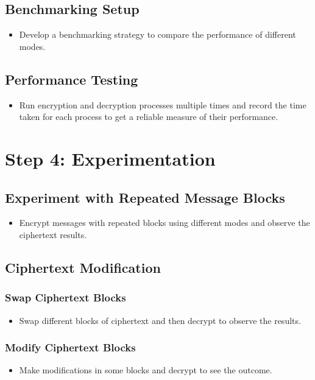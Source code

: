 \documentclass{exam}
\begin{document}
  \subsection*{Benchmarking Setup}
  \begin{itemize}
      \item Develop a benchmarking strategy to compare the performance of different modes.
  \end{itemize}

  \subsection*{Performance Testing}
  \begin{itemize}
      \item Run encryption and decryption processes multiple times and record the time taken for each process to get a reliable measure of their performance.
  \end{itemize}

  \section*{Step 4: Experimentation}

  \subsection*{Experiment with Repeated Message Blocks}
  \begin{itemize}
      \item Encrypt messages with repeated blocks using different modes and observe the ciphertext results.
  \end{itemize}

  \subsection*{Ciphertext Modification}
  \subsubsection*{Swap Ciphertext Blocks}
  \begin{itemize}
      \item Swap different blocks of ciphertext and then decrypt to observe the results.
  \end{itemize}
  \subsubsection*{Modify Ciphertext Blocks}
  \begin{itemize}
      \item Make modifications in some blocks and decrypt to see the outcome.
  \end{itemize}
\end{document}
